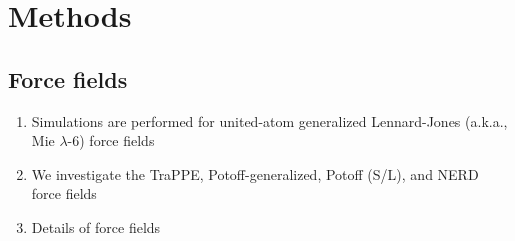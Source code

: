 \documentclass[journal=jced,manuscript=article]{achemso}
\begin{document}
%

\section{Methods} \label{sec: Methods}

\subsection{Force fields} \label{sec: Force fields}

\begin{enumerate}
	\item Simulations are performed for united-atom generalized Lennard-Jones (a.k.a., Mie $\lambda$-6) force fields
	\item We investigate the TraPPE, Potoff-generalized, Potoff (S/L), and NERD force fields 
	\item Details of force fields
\end{enumerate}
\end{document}
